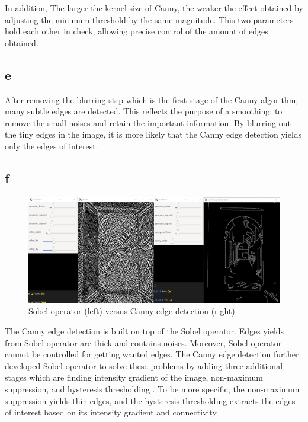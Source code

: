 In addition, The larger the kernel size of Canny, the weaker the effect obtained by adjusting the minimum threshold by the same magnitude. This two parameters hold each other in check, allowing precise control of the amount of edges obtained.



\subsection{e}
After removing the blurring step which is the first stage of the Canny algorithm, many subtle edges are detected. This reflects the purpose of a smoothing; to remove the small noises and retain the important information. By blurring out the tiny edges in the image, it is more likely that the Canny edge detection yields only the edges of interest.



\subsection{f}
\begin{figure}[htbp]
   \centering
   \includegraphics[width=\textwidth]{assets/images/figures/Sobel_VS_Canny.png}
   \caption{Sobel operator (left) versus Canny edge detection (right)}
   \label{fig:Sobel_VS_Canny}
\end{figure}

The Canny edge detection is built on top of the Sobel operator. Edges yields from Sobel operator are thick and contains noises. Moreover, Sobel operator cannot be controlled for getting wanted edges. The Canny edge detection further developed Sobel operator to solve these problems by adding three additional stages which are finding intensity gradient of the image, non-maximum suppression, and hysteresis thresholding \cite{ref:canny_ttl}. To be more specific, the non-maximum suppression yields thin edges, and the hysteresis thresholding extracts the edges of interest based on its intensity gradient and connectivity.




